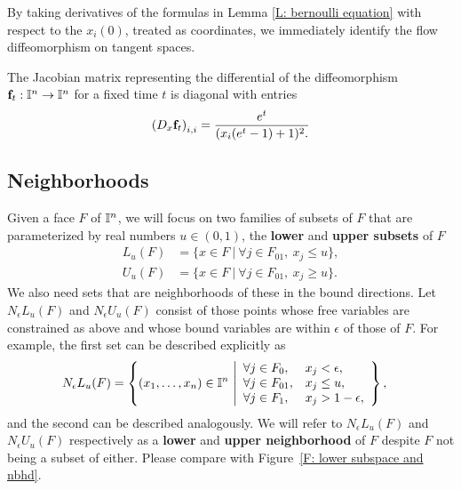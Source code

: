 By taking derivatives of the formulas in Lemma \ref{L: bernoulli equation} with respect to the $x_i(0)$, treated as coordinates, we immediately identify the flow diffeomorphism on tangent spaces.

\begin{corollary}\label{C: pushforward of vectors along the flow}
	The Jacobian matrix representing the differential of the diffeomorphism $\mathbf{f}_t:\mathbb{I}^n \to \mathbb{I}^n$ for a fixed time $t$	is diagonal with entries
	\begin{equation*}
		\left(D_x \mathbf{f}_t\right)_{i,i} = \frac{e^t}{(x_i(e^t -1) + 1)^2.}
	\end{equation*}
\end{corollary}

\subsection{Neighborhoods}\label{S: neighborhoods}

Given a face $F$ of $\mathbb{I}^n$, we will focus on two families of subsets of $F$ that are parameterized by real numbers $u \in (0,1)$, the \textbf{lower} and \textbf{upper subsets} of $F$
\begin{align*}
	L_u(F) & = \{x \in F\ |\ \forall j \in F_{01},\ x_j \leq u\}, \\
	U_u(F) & = \{x \in F\ |\ \forall j \in F_{01},\ x_j \geq u\}.
\end{align*}
We also need sets that are neighborhoods of these in the bound directions.
Let $N_\epsilon L_u(F)$ and $N_\epsilon U_u(F)$ consist of those points whose free variables are constrained as above and whose bound variables are within $\epsilon$ of those of $F$.
For example, the first set can be described explicitly as
\begin{align*}
	N_\epsilon L_u (F) & = \left\{(x_1,\ldots, x_n) \in \interval^n\ \middle|
	\begin{array}{ll}
		\forall j \in F_0, & x_j < \epsilon, \\
		\forall j \in F_{01}, & x_j \leq u, \\
		\forall j \in F_1, & x_j>1-\epsilon,
	\end{array}\right\},
\end{align*}
and the second can be described analogously.
We will refer to $N_\epsilon L_u(F)$ and $N_\epsilon U_u(F)$ respectively as a \textbf{lower} and \textbf{upper neighborhood} of $F$ despite $F$ not being a subset of either.
Please compare with Figure~\ref{F: lower subspace and nbhd}.


